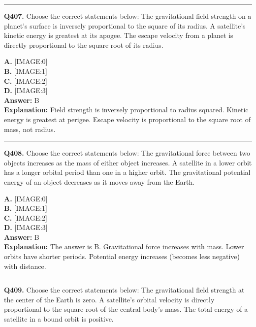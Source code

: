 \documentclass[12pt]{article}
\begin{document}
\hrule
\vspace{1em}


\noindent
\textbf{Q407.} Choose the correct statements below:
The gravitational field strength on a planet's surface is inversely proportional to the square of its radius.
A satellite's kinetic energy is greatest at its apogee.
The escape velocity from a planet is directly proportional to the square root of its radius.



\textbf{A.} [IMAGE:0] \\
\textbf{B.} [IMAGE:1] \\
\textbf{C.} [IMAGE:2] \\
\textbf{D.} [IMAGE:3] \\

\textbf{Answer:} B \\
\textbf{Explanation:} Field strength is inversely proportional to radius squared. Kinetic energy is greatest at perigee. Escape velocity is proportional to the square root of mass, not radius.

\hrule
\vspace{1em}


\noindent
\textbf{Q408.} Choose the correct statements below:
The gravitational force between two objects increases as the mass of either object increases.
A satellite in a lower orbit has a longer orbital period than one in a higher orbit.
The gravitational potential energy of an object decreases as it moves away from the Earth.



\textbf{A.} [IMAGE:0] \\
\textbf{B.} [IMAGE:1] \\
\textbf{C.} [IMAGE:2] \\
\textbf{D.} [IMAGE:3] \\

\textbf{Answer:} B \\
\textbf{Explanation:} The answer is B. Gravitational force increases with mass. Lower orbits have shorter periods. Potential energy increases (becomes less negative) with distance.

\hrule
\vspace{1em}


\noindent
\textbf{Q409.} Choose the correct statements below:
The gravitational field strength at the center of the Earth is zero.
A satellite's orbital velocity is directly proportional to the square root of the central body's mass.
The total energy of a satellite in a bound orbit is positive.
\end{document}
